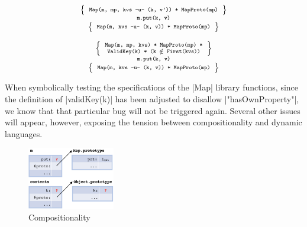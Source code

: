 \smallskip
\begin{minipage}{0.475\textwidth}
\begin{displaymath} 
{\scriptsize
\begin{array}{c}
\left\{ {\begin{array}{c}
 \text{\texttt{Map(m, mp, kvs -u- (k, v')) * MapProto(mp)}}
\end{array}} \right\} \\
%
\text{\bfseries \texttt{m.put(k, v)}} \\[0.2mm]
%
\left\{ {\begin{array}{c}
 \text{\texttt{Map(m, kvs -u- (k, v)) * MapProto(mp)}}
\end{array}} \right\}
\end{array}
} 
\end{displaymath}
\end{minipage}
\quad
\begin{minipage}{0.48\textwidth}
%
\begin{displaymath} 
{\scriptsize
\begin{array}{c}
\left\{ {\begin{array}{c}
 \text{\texttt{Map(m, mp, kvs) * MapProto(mp) *}} \\
 \text{\texttt{ValidKey(k) * (k $\notin$ First(kvs))}}
\end{array}} \right\} \\
%
\text{\bfseries \texttt{m.put(k, v)}} \\[0.2mm]
%
\left\{ {\begin{array}{c}
 \text{\texttt{Map(m, kvs -u- (k, v)) * MapProto(mp)}}
\end{array}} \right\}
\end{array}
} 
\end{displaymath}
\end{minipage}

\medskip
When symbolically testing the specifications of the \jsinline|Map| library functions, since the definition of \jsinline|validKey(k)| has been adjusted to disallow \jsinline|"hasOwnProperty"|, we know that that particular bug will not be triggered again. Several other issues will appear, however, exposing the tension between compositionality and dynamic languages. 

\begin{figure}
\vspace*{-0.4cm}
\centering
\includegraphics[width=0.34\textwidth]{figures/compositional.png}
\vspace*{-0.2cm}
\caption{Compositionality }
\label{fig:compositionality}
\vspace*{-0.4cm}
\end{figure}

